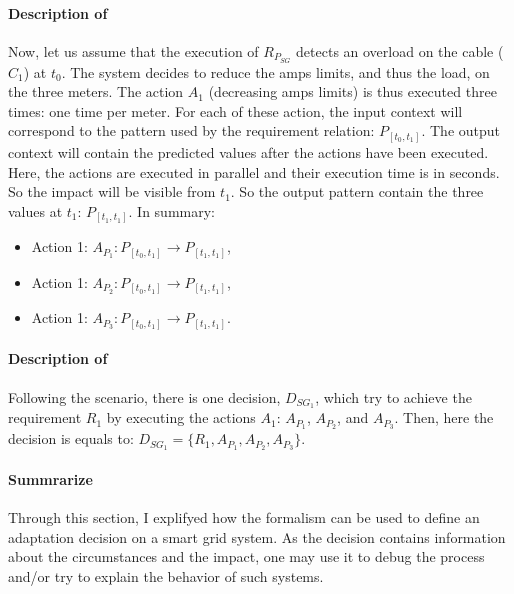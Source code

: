 \paragraph{Description of }
Now, let us assume that the execution of $R_{P_{SG}}$ detects an overload on the cable ($C_1$) at $t_0$.
The system decides to reduce the amps limits, and thus the load, on the three meters.
The action $A_1$ (decreasing amps limits) is thus executed three times: one time per meter.
For each of these action, the input context will correspond to the pattern used by the requirement relation: $P_{[t_0, t_1]}$.
The output context will contain the predicted values after the actions have been executed.
Here, the actions are executed in parallel and their execution time is in seconds.
So the impact will be visible from $t_1$.
So the output pattern contain the three values at $t_1$:  $P_{[t_1, t_1]}$.
In summary:
\begin{itemize}
	\item Action 1: $A_{P_1}: P_{[t_0, t_1]} \rightarrow P_{[t_1, t_1]}$,
	\item Action 1: $A_{P_2}: P_{[t_0, t_1]} \rightarrow P_{[t_1, t_1]}$,
	\item Action 1: $A_{P_3}: P_{[t_0, t_1]} \rightarrow P_{[t_1, t_1]}$.
\end{itemize}


\paragraph{Description of }
Following the scenario, there is one decision, $D_{SG_1}$, which try to achieve the requirement $R_1$ by executing the actions $A_1$: $A_{P_1}$, $A_{P_2}$, and $A_{P_3}$.
Then, here the decision is equals to: $D_{SG_1} = \{R_1, A_{P_1}, A_{P_2}, A_{P_3}\}$.

\paragraph{Summrarize}
Through this section, I explifyed how the formalism can be used to define an adaptation decision on a smart grid system.
As the decision contains information about the circumstances and the impact, one may use it to debug the process and/or try to explain the behavior of such systems.